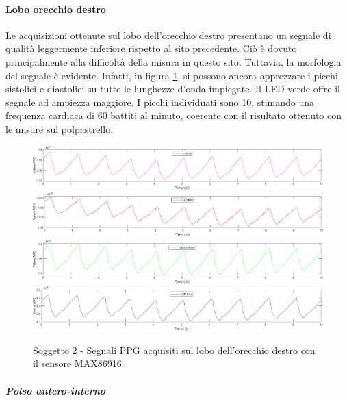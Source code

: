 \paragraph{Lobo orecchio destro}
Le acquisizioni ottenute sul lobo dell'orecchio destro presentano un segnale di qualità leggermente inferiore rispetto al sito precedente. Ciò è dovuto principalmente alla difficoltà della misura in questo sito. Tuttavia, la morfologia del segnale è evidente. Infatti, in figura \ref{fig:soggetto2_MAX86916_lobo}, si possono ancora apprezzare i picchi sistolici e diastolici su tutte le lunghezze d'onda impiegate. Il LED verde offre il segnale ad ampiezza maggiore. I picchi individuati sono 10, stimando una frequenza cardiaca di 60 battiti al minuto, coerente con il risultato ottenuto con le misure sul polpastrello.
\begin{figure}[h]
	\centering
	\includegraphics[width=1\linewidth]{ImageFiles/Misure Preliminari/Soggetto 2/max86916/lobo_ired}
	\includegraphics[width=1\linewidth]{ImageFiles/Misure Preliminari/Soggetto 2/max86916/lobo_red}
	\includegraphics[width=1\linewidth]{ImageFiles/Misure Preliminari/Soggetto 2/max86916/lobo_green}
	\includegraphics[width=1\linewidth]{ImageFiles/Misure Preliminari/Soggetto 2/max86916/lobo_blu}
	\caption{Soggetto 2 - Segnali PPG acquisiti sul lobo dell'orecchio destro con il sensore MAX86916.}
	\label{fig:soggetto2_MAX86916_lobo}
\end{figure}

\clearpage

\subparagraph{Polso antero-interno}

